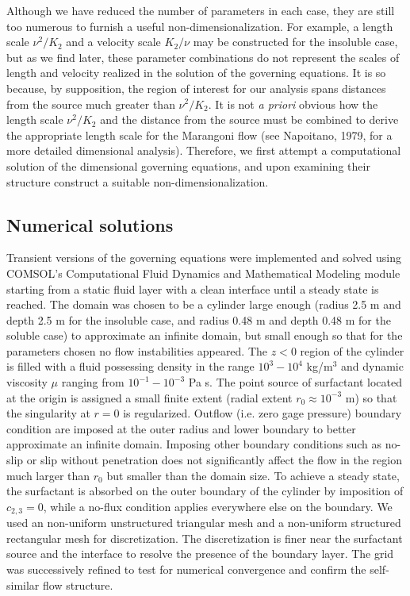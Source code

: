 \documentclass[]{jfm}
\begin{document}
Although we have reduced the number of parameters in each case, they are still too numerous to furnish a useful non-dimensionalization.
For example, a length scale $\nu^2/K_2$ and a velocity scale $K_2/\nu$ may be constructed for the insoluble case, but as we find later, these parameter combinations do not represent the scales of length and velocity realized in the solution of the governing equations.
It is so because, by supposition, the region of interest for our analysis spans distances from the source much greater than $\nu^2/K_2$.
It is not {\it a priori} obvious how the length scale $\nu^2/K_2$ and the distance from the source must be combined to derive the appropriate length scale for the Marangoni flow (see Napoitano, 1979, \nocite{Napolitano1979} for a more detailed dimensional analysis).
Therefore, we first attempt a computational solution of the dimensional governing equations, and upon examining their structure construct a suitable non-dimensionalization.

\subsection{Numerical solutions}
\label{subsec:numerical}
Transient versions of the governing equations were implemented and solved using COMSOL's Computational Fluid Dynamics and Mathematical Modeling module starting from a static fluid layer with a clean interface until a steady state is reached.
The domain was chosen to be a cylinder large enough (radius 2.5 m and depth 2.5 m for the insoluble case, and radius 0.48 m and depth 0.48 m for the soluble case) to approximate an infinite domain, but small enough so that for the parameters chosen no flow instabilities appeared. 
The $z<0$ region of the cylinder is filled with a fluid possessing density in the range $10^{3}-10^4$ kg/m$^3$ and dynamic viscosity $\mu$ ranging from $10^{-1}-10^{-3}$ Pa s. 
The point source of surfactant located at the origin is assigned a small finite extent (radial extent $r_0 \approx 10^{-3}$ m) so that the singularity at $r=0$ is regularized.
Outflow (i.e. zero gage pressure) boundary condition are imposed at the outer radius and lower boundary to better approximate an infinite domain.
Imposing other boundary conditions such as no-slip or slip without penetration does not significantly affect the flow in the region much larger than $r_0$ but smaller than the domain size.
To achieve a steady state, the surfactant is absorbed on the outer boundary of the cylinder by imposition of $c_{2,3}=0$, while a no-flux condition applies everywhere else on the boundary.
We used an non-uniform unstructured triangular mesh and a non-uniform structured rectangular mesh for discretization.
The discretization is finer near the surfactant source and the interface to resolve the presence of the boundary layer.
The grid was successively refined to test for numerical convergence and confirm the self-similar flow structure. 
\end{document}

